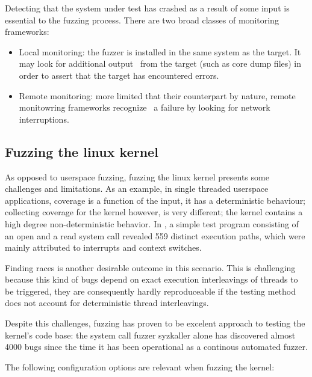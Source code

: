 Detecting that the system under test has crashed as a result of some input is essential to the fuzzing process.
There are two broad classes of monitoring frameworks\cite{mcnallyFuzzingStateArt2012}:

\begin{itemize}
    \item Local monitoring: the fuzzer is installed in the same system as the target. It may look for additional output \
    from the target (such as core dump files) in order to assert that the target has encountered errors.
    \item Remote monitoring: more limited that their counterpart by nature, remote monitowring frameworks recognize \
    a failure by looking for network interruptions.
\end{itemize}

\subsection{Fuzzing the linux kernel}

As opposed to userspace fuzzing, fuzzing the linux kernel
presents some challenges and limitations. As an example, in single threaded
userspace applications, coverage is a function of the input, it has a
deterministic behaviour; collecting coverage for the kernel however, is
very different;  the kernel contains a high degree
non-deterministic behavior. In \cite{okechInvestigatingExecutionPath2013}, a
simple test program consisting of an open and a read system call revealed
559 distinct execution paths, which were mainly attributed to interrupts and context switches.

Finding races is another desirable outcome in this scenario. This is
challenging because this kind of bugs depend on exact
execution interleavings of threads to be triggered, they are consequently hardly reproduceable if the testing method does not account for deterministic
thread interleavings.

Despite this challenges, fuzzing has proven to be excelent approach to testing the
kernel's code base: the system call fuzzer syzkaller alone has discovered
almost  4000 bugs since the time it has been operational as a continous
automated fuzzer\cite{Syzbot}.

The following configuration options are relevant when fuzzing the kernel:

